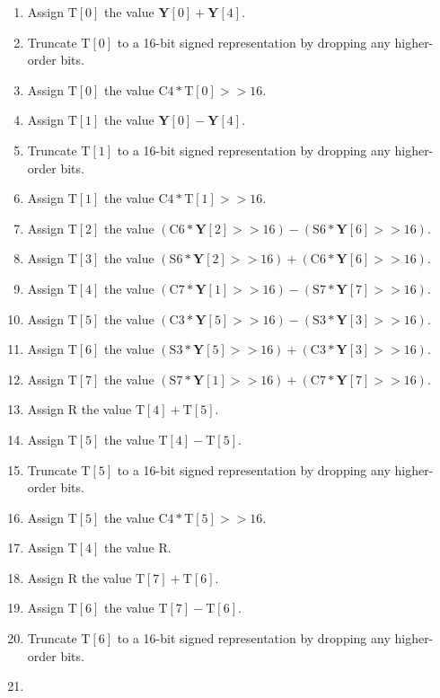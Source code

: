 \documentclass[9pt,letterpaper]{book}
\newcommand{\bitvar}[1]{\ensuremath{\mathbf{\bm{#1}}}}
\newcommand{\locvar}[1]{\ensuremath{\mathrm{#1}}}
\numberwithin{equation}{chapter}
\numberwithin{figure}{chapter}
\numberwithin{table}{chapter}
\begin{document}
\begin{enumerate}
\item
Assign $\locvar{T}[0]$ the value $\bitvar{Y}[0]+\bitvar{Y}[4]$.
\item
Truncate $\locvar{T}[0]$ to a 16-bit signed representation by dropping any
 higher-order bits.
\item
Assign $\locvar{T}[0]$ the value
 $\locvar{C4}*\locvar{T}[0]>>16$.
\item
Assign $\locvar{T}[1]$ the value $\bitvar{Y}[0]-\bitvar{Y}[4]$.
\item
Truncate $\locvar{T}[1]$ to a 16-bit signed representation by dropping any
 higher-order bits.
\item
Assign $\locvar{T}[1]$ the value $\locvar{C4}*\locvar{T}[1]>>16$.
\item
Assign $\locvar{T}[2]$ the value $(\locvar{C6}*\bitvar{Y}[2]>>16)-
 (\locvar{S6}*\bitvar{Y}[6]>>16)$.
\item
Assign $\locvar{T}[3]$ the value $(\locvar{S6}*\bitvar{Y}[2]>>16)+
 (\locvar{C6}*\bitvar{Y}[6]>>16)$.
\item
Assign $\locvar{T}[4]$ the value $(\locvar{C7}*\bitvar{Y}[1]>>16)-
 (\locvar{S7}*\bitvar{Y}[7]>>16)$.
\item
Assign $\locvar{T}[5]$ the value $(\locvar{C3}*\bitvar{Y}[5]>>16)-
 (\locvar{S3}*\bitvar{Y}[3]>>16)$.
\item
Assign $\locvar{T}[6]$ the value $(\locvar{S3}*\bitvar{Y}[5]>>16)+
 (\locvar{C3}*\bitvar{Y}[3]>>16)$.
\item
Assign $\locvar{T}[7]$ the value $(\locvar{S7}*\bitvar{Y}[1]>>16)+
 (\locvar{C7}*\bitvar{Y}[7]>>16)$.
\item
Assign \locvar{R} the value $\locvar{T}[4]+\locvar{T}[5]$.
\item
Assign $\locvar{T}[5]$ the value $\locvar{T}[4]-\locvar{T}[5]$.
\item
Truncate $\locvar{T}[5]$ to a 16-bit signed representation by dropping any
 higher-order bits.
\item
Assign $\locvar{T}[5]$ the value $\locvar{C4}*\locvar{T}[5]>>16$.
\item
Assign $\locvar{T}[4]$ the value $\locvar{R}$.
\item
Assign \locvar{R} the value $\locvar{T}[7]+\locvar{T}[6]$.
\item
Assign $\locvar{T}[6]$ the value $\locvar{T}[7]-\locvar{T}[6]$.
\item
Truncate $\locvar{T}[6]$ to a 16-bit signed representation by dropping any
 higher-order bits.
\item

\end{enumerate}
\end{document}
